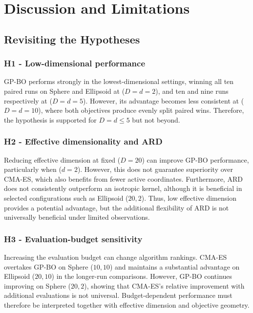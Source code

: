 \documentclass[11pt]{article}
\begin{document}
\section{Discussion and Limitations}

\subsection{Revisiting the Hypotheses}

\subsubsection*{H1 - Low-dimensional performance}
GP-BO performs strongly in the lowest-dimensional settings, winning all ten paired runs on Sphere and Ellipsoid at ($D = d = 2$), and ten and nine runs respectively at ($D = d = 5$). However, its advantage becomes less consistent at ($D = d = 10$), where both objectives produce evenly split paired wins. Therefore, the hypothesis is supported for $D = d \leq 5$ but not beyond. 

\subsubsection*{H2 - Effective dimensionality and ARD}
Reducing effective dimension at fixed ($D = 20$) can improve GP-BO performance, particularly when ($d=2$). However, this does not guarantee superiority over CMA-ES, which also benefits from fewer active coordinates. Furthermore, ARD does not consistently outperform an isotropic kernel, although it is beneficial in selected configurations such as Ellipsoid ($20,2$). Thus, low effective dimension provides a potential advantage, but the additional flexibility of ARD is not universally beneficial under limited observations. 

\subsubsection*{H3 - Evaluation-budget sensitivity}
Increasing the evaluation budget can change algorithm rankings. CMA-ES overtakes GP-BO on Sphere ($10,10$) and maintains a substantial advantage on Ellipsoid ($20,10$) in the longer-run comparisons. However, GP-BO continues improving on Sphere ($20,2$), showing that CMA-ES's relative improvement with additional evaluations is not universal. Budget-dependent performance must therefore be interpreted together with effective dimension and objective geometry.
\end{document}

